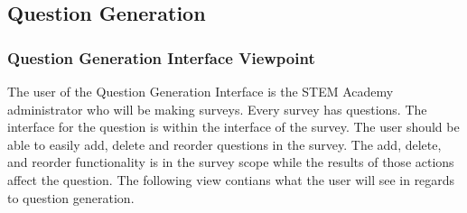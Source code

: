 \subsection{Question Generation}

\subsubsection{Question Generation Interface Viewpoint}
The user of the Question Generation Interface is the STEM Academy administrator who will be making surveys. Every survey has
questions. The interface for the question is within the interface of the survey. The user should be able to easily add, delete and 
reorder questions in the survey. The add, delete, and reorder functionality is in the survey scope while the results of those actions
affect the question. The following view contians what the user will see in regards to question generation. 
